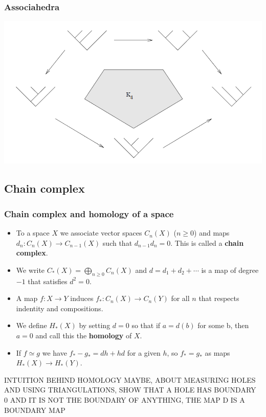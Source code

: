 \documentclass{beamer}
\theoremstyle{definition}
\begin{document}
\begin{frame}
\frametitle{Associahedra}
\includegraphics[scale=0.5]{Imagenes/assoc}
\end{frame}
\subsection{Chain complex}
\begin{frame}
\frametitle{Chain complex and homology of a space}
\begin{itemize}
\item<1-> To a space $X$ we associate vector spaces $C_n(X)$ ($n\geq 0$) and maps $d_n:C_n(X)\to C_{n-1}(X)$ such that $d_{n-1}d_n=0$. This is called a \textbf{chain complex}.
\item<2-> We write $C_*(X)=\bigoplus_{n\geq 0} C_n(X)$ and $d=d_1+d_2+\cdots$ is a map of degree $-1$ that satisfies $d^2=0$.%
\item<3-> A map $f:X\to Y$ induces $f_*:C_n(X)\to C_n(Y)$ for all $n$ that respects indentity and compositions. %
\item<4-> We define $H_*(X)$ by setting $d=0$ so that if $a=d(b)$ for some b, then $a=0$ and call this the \textbf{homology} of $X$. %
\item<5-> If $f\simeq g$ we have $f_*-g_*=dh+hd$ for a given $h$, so $f_*=g_*$ as maps $H_*(X)\to H_*(Y)$. %
\end{itemize}

\end{frame}

\begin{frame}
INTUITION BEHIND HOMOLOGY MAYBE, ABOUT MEASURING HOLES AND USING TRIANGULATIONS, SHOW THAT A HOLE HAS BOUNDARY 0 AND IT IS NOT THE BOUNDARY OF ANYTHING, THE MAP D IS A BOUNDARY MAP
\end{frame}
\end{document}
